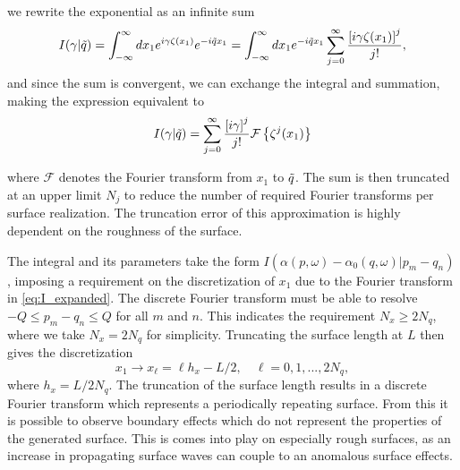 \documentclass[../main.tex]{subfiles}
\begin{document}
we rewrite the exponential as an infinite sum
\begin{equation*}
    I(\gamma|\Tilde{q}) = \int_{-\infty}^{\infty}dx_1 
        e^{i\gamma\zeta(x_1)} e^{-i\Tilde{q}x_1}
            = \int_{-\infty}^{\infty}dx_1 
            e^{-i\Tilde{q}x_1}
            \sum_{j=0}^{\infty}
                \frac{ \left[i\gamma\zeta(x_1) \right]^j}{ j! },
\end{equation*}
and since the sum is convergent, 
we can exchange the integral and summation, 
making the expression equivalent to
\begin{equation}\label{eq:I_expanded}
    I(\gamma | \Tilde{q}) = \sum_{j=0}^\infty \frac{ \left[i\gamma\right]^j}{j!}\mathcal{F}\left\{\zeta^j(x_1)\right\}
\end{equation}

where $\mathcal{F}$ denotes the Fourier transform from $x_1$ to $\Tilde{q}$. 
The sum is then truncated at an upper limit $N_j$ 
to reduce the number of required Fourier transforms per surface realization. 
The truncation error of this approximation 
is highly dependent on the roughness of the surface.

The integral and its parameters take the form $I(\alpha(p,\omega) - \alpha_0(q,\omega) | p_m - q_n)$, 
imposing a requirement on the discretization of $x_1$ due to the Fourier transform in \autoref{eq:I_expanded}. 
The discrete Fourier transform must be able to resolve $-Q \leq p_m - q_n \leq Q$ for all $m$ and $n$. 
This indicates the requirement $N_x \geq 2N_q$, where we take $N_x = 2N_q$ for simplicity. 
Truncating the surface length at $L$ then gives the discretization
\begin{equation}
    x_1 \longrightarrow x_\ell = \ell h_x - L/2,\quad \ell = 0,1,...,2N_q,
\end{equation}
where $h_x = L/2N_q$. 
The truncation of the surface length results in a discrete Fourier transform
which represents a periodically repeating surface.
From this it is possible to observe boundary effects 
which do not represent the properties of the generated surface.
This is comes into play on especially rough surfaces,
as an increase in propagating surface waves can couple to an anomalous surface effects.

\end{document}
